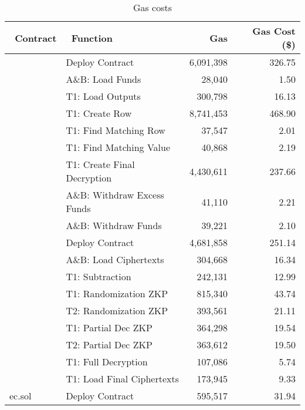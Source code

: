 \begin{table}[t]
		\centering
	\begin{tabular}{|l|l|r|r|}
		\hline
		~\textbf{Contract} & ~\textbf{Function } & ~\textbf{Gas}  & ~\textbf{Gas Cost (\$)}  \\ \hline
		\multirow{8}{*}{}  
		& Deploy Contract &6,091,398 & 326.75 \\ \cline{2-4} 
		& A\&B: Load Funds & 28,040  &1.50  \\ \cline{2-4} 
		& T1: Load Outputs&  300,798 & 16.13 \\  \cline{2-4} 
		& T1: Create Row & 8,741,453 & 468.90 \\  \cline{2-4}
		Mixmatch.sol	& T1: Find Matching Row & 37,547 &2.01  \\  \cline{2-4}
		& T1: Find Matching Value &  40,868&2.19 \\  \cline{2-4}
		& T1:  Create Final Decryption&  4,430,611& 237.66 \\  \cline{2-4}
		& A\&B: Withdraw Excess Funds &  41,110& 2.21 \\  \cline{2-4}
		&  A\&B:  Withdraw Funds&  39,221& 2.10 \\   \hline
		\multirow{8}{*}{} 
		& Deploy Contract & 4,681,858&251.14 \\ \cline{2-4} 
		&   A\&B: Load Ciphertexts & 304,668 & 16.34 \\  \cline{2-4}
		& T1: Subtraction & 242,131 & 12.99\\  \cline{2-4}
		& T1: Randomization ZKP& 815,340 &  43.74\\  \cline{2-4}
		PET.sol	&  T2: Randomization ZKP& 393,561 &21.11  \\  \cline{2-4}
		& T1: Partial Dec ZKP& 364,298 & 19.54\\  \cline{2-4}
		& T2: Partial Dec ZKP & 363,612 & 19.50 \\  \cline{2-4}
		& T1: Full Decryption  &  107,086& 5.74 \\  \cline{2-4}
		& T1:  Load Final Ciphertexts& 173,945 & 9.33\\ \cline{1-4} 
	ec.sol	& Deploy Contract &595,517 & 31.94 \\ \hline
	\end{tabular}
	\caption{Gas costs}
	 \label{tab:gascost}
\end{table}